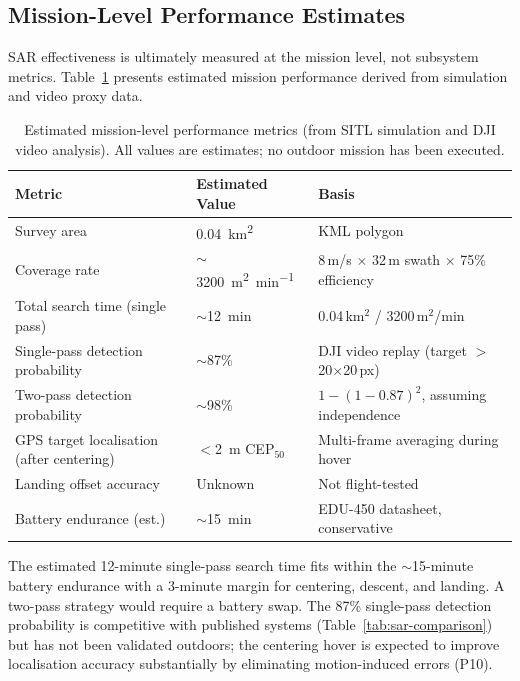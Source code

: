 \subsection{Mission-Level Performance Estimates}\label{sec:mission-metrics}

SAR effectiveness is ultimately measured at the mission level, not subsystem metrics. Table~\ref{tab:mission-metrics} presents estimated mission performance derived from simulation and video proxy data.

\begin{table}[htbp]
\centering\small
\caption{Estimated mission-level performance metrics (from SITL simulation and DJI video analysis). All values are estimates; no outdoor mission has been executed.}\label{tab:mission-metrics}
\begin{tabular}{@{}lll@{}}
\toprule
\textbf{Metric} & \textbf{Estimated Value} & \textbf{Basis} \\
\midrule
Survey area & \SI{0.04}{\kilo\metre\squared} & KML polygon \\
Coverage rate & ${\sim}$\SI{3200}{\metre\squared\per\minute} & 8\,m/s $\times$ 32\,m swath $\times$ 75\% efficiency \\
Total search time (single pass) & ${\sim}$\SI{12}{\minute} & 0.04\,km$^2$ / 3200\,m$^2$/min \\
Single-pass detection probability & ${\sim}$87\% & DJI video replay (target $>$ 20$\times$20\,px) \\
Two-pass detection probability & ${\sim}$98\% & $1 - (1-0.87)^2$, assuming independence \\
GPS target localisation (after centering) & $<$\SI{2}{\metre} CEP$_{50}$ & Multi-frame averaging during hover \\
Landing offset accuracy & Unknown & Not flight-tested \\
Battery endurance (est.) & ${\sim}$\SI{15}{\minute} & EDU-450 datasheet, conservative \\
\bottomrule
\end{tabular}
\end{table}

The estimated 12-minute single-pass search time fits within the ${\sim}$15-minute battery endurance with a 3-minute margin for centering, descent, and landing. A two-pass strategy would require a battery swap. The 87\% single-pass detection probability is competitive with published systems (Table~\ref{tab:sar-comparison}) but has not been validated outdoors; the centering hover is expected to improve localisation accuracy substantially by eliminating motion-induced errors (P10).

